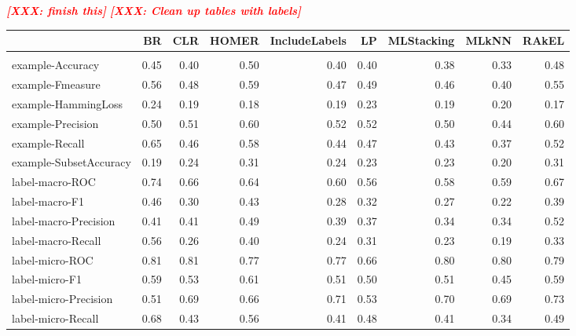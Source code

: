\documentclass{acm_proc_article-sp}
\newcommand{\XXX}[1]{\textcolor{red}{{\it \textbf{[XXX: #1]}}}}
\begin{document}
\XXX{finish this}
\XXX{Clean up tables with labels}
\begin{table}
\centering
\begin{tabular}{l|rrrrrrrr}

  & BR & CLR & HOMER & IncludeLabels & LP & MLStacking & MLkNN & RAkEL \\

\hline \\

example-Accuracy & 0.45 & 0.40 & 0.50 & 0.40 & 0.40 & 0.38 & 0.33 & 0.48 \\

example-Fmeasure & 0.56 & 0.48 & 0.59 & 0.47 & 0.49 & 0.46 & 0.40 & 0.55 \\

example-HammingLoss & 0.24 & 0.19 & 0.18 & 0.19 & 0.23 & 0.19 & 0.20 & 0.17 \\

example-Precision & 0.50 & 0.51 & 0.60 & 0.52 & 0.52 & 0.50 & 0.44 & 0.60 \\

example-Recall & 0.65 & 0.46 & 0.58 & 0.44 & 0.47 & 0.43 & 0.37 & 0.52 \\

example-SubsetAccuracy & 0.19 & 0.24 & 0.31 & 0.24 & 0.23 & 0.23 & 0.20 & 0.31 \\

label-macro-ROC & 0.74 & 0.66 & 0.64 & 0.60 & 0.56 & 0.58 & 0.59 & 0.67 \\

label-macro-F1 & 0.46 & 0.30 & 0.43 & 0.28 & 0.32 & 0.27 & 0.22 & 0.39 \\

label-macro-Precision & 0.41 & 0.41 & 0.49 & 0.39 & 0.37 & 0.34 & 0.34 & 0.52 \\

label-macro-Recall & 0.56 & 0.26 & 0.40 & 0.24 & 0.31 & 0.23 & 0.19 & 0.33 \\

label-micro-ROC & 0.81 & 0.81 & 0.77 & 0.77 & 0.66 & 0.80 & 0.80 & 0.79 \\

label-micro-F1 & 0.59 & 0.53 & 0.61 & 0.51 & 0.50 & 0.51 & 0.45 & 0.59 \\

label-micro-Precision & 0.51 & 0.69 & 0.66 & 0.71 & 0.53 & 0.70 & 0.69 & 0.73 \\

label-micro-Recall & 0.68 & 0.43 & 0.56 & 0.41 & 0.48 & 0.41 & 0.34 & 0.49 \\


\end{tabular}
\end{table}
\end{document}
